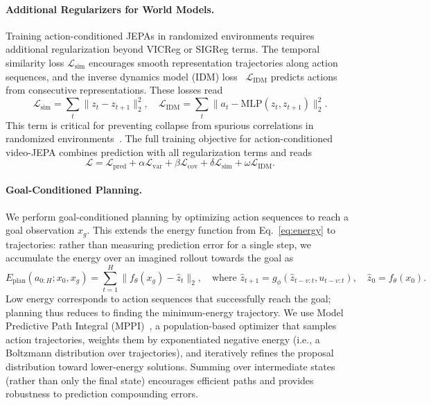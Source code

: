 \documentclass{article}
\begin{document}
\paragraph{Additional Regularizers for World Models.}
Training action-conditioned JEPAs in randomized environments requires additional regularization beyond VICReg or SIGReg terms.
The temporal similarity loss $\mathcal{L}_{\text{sim}}$ encourages smooth representation trajectories along action sequences, and the inverse dynamics model (IDM) loss~\citep{curiositydrivenexplorationselfsupervisedprediction} $\mathcal{L}_{\text{IDM}}$ predicts actions from consecutive representations. These losses read
\begin{equation}
\mathcal{L}_{\text{sim}} = \sum_t \|z_t - z_{t+1}\|_2^2, \quad \mathcal{L}_{\text{IDM}} = \sum_t \|a_t - \text{MLP}(z_t, z_{t+1})\|_2^2.
\end{equation}
This term is critical for preventing collapse from spurious correlations in randomized environments~\citep{sobal2022jepaslowfeatures}.
The full training objective for action-conditioned video-JEPA combines prediction with all regularization terms and reads
\begin{equation}
\mathcal{L} = \mathcal{L}_{\text{pred}} + \alpha \mathcal{L}_{\text{var}} + \beta \mathcal{L}_{\text{cov}} + \delta \mathcal{L}_{\text{sim}} + \omega \mathcal{L}_{\text{IDM}}.
\label{eq:ac_video_full_loss}
\end{equation}

\paragraph{Goal-Conditioned Planning.}
We perform goal-conditioned planning by optimizing action sequences to reach a goal observation $x_g$.
This extends the energy function from Eq.~\eqref{eq:energy} to trajectories: rather than measuring prediction error for a single step, we accumulate the energy over an imagined rollout towards the goal as
\begin{equation}\label{eq:planning_energy}
E_{\text{plan}}(a_{0:H}; x_0, x_g) = \sum_{t=1}^{H} \| f_\theta(x_g) - \hat{z}_t \|_2, \quad \text{where } \hat{z}_{t+1} = g_\phi(\hat{z}_{t-v:t}, u_{t-v:t}), \quad \hat{z}_0 = f_\theta(x_0).
\end{equation}
Low energy corresponds to action sequences that successfully reach the goal; planning thus reduces to finding the minimum-energy trajectory.
We use Model Predictive Path Integral (MPPI)~\citep{MPPI}, a population-based optimizer that samples action trajectories, weights them by exponentiated negative energy (i.e., a Boltzmann distribution over trajectories), and iteratively refines the proposal distribution toward lower-energy solutions.
Summing over intermediate states (rather than only the final state) encourages efficient paths and provides robustness to prediction compounding errors.
\end{document}
